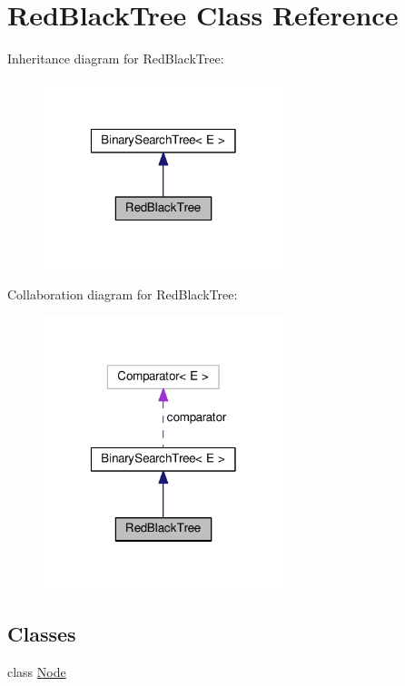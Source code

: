 \hypertarget{class_red_black_tree}{}\section{Red\+Black\+Tree Class Reference}
\label{class_red_black_tree}


Inheritance diagram for Red\+Black\+Tree\+:
\nopagebreak
\begin{figure}[H]
\begin{center}
\leavevmode
\includegraphics[width=198pt]{class_red_black_tree__inherit__graph}
\end{center}
\end{figure}


Collaboration diagram for Red\+Black\+Tree\+:
\nopagebreak
\begin{figure}[H]
\begin{center}
\leavevmode
\includegraphics[width=198pt]{class_red_black_tree__coll__graph}
\end{center}
\end{figure}
\subsection*{Classes}
\begin{DoxyCompactItemize}
\item 
class \hyperlink{class_red_black_tree_1_1_node}{Node}
\end{DoxyCompactItemize}
